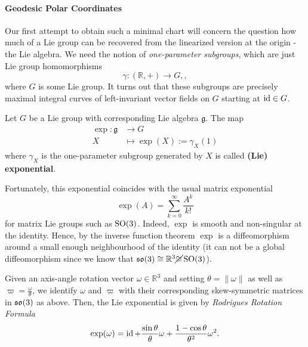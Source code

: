 \paragraph*{Geodesic Polar Coordinates}
Our first attempt to obtain such a minimal chart will concern the question how much of a Lie group can be recovered from the linearized version at the origin - the Lie algebra. We need the notion of \emph{one-parameter subgroups}, which are just Lie group homomorphisms \[
\gamma: (\mathbb{R}, +) \to G,
,\] where $G$ is some Lie group. It turns out that these subgroups are precisely maximal integral curves of left-invariant vector fields on $G$ starting at $\operatorname{id} \in G$.
\begin{definition}
   Let $G$ be a Lie group with corresponding Lie algebra $\mathfrak{g}$. The map 
   \begin{align*}
       \exp: \mathfrak{g} &\to G\\
       X &\mapsto \exp(X):=\gamma_X(1)
   \end{align*}
   where $\gamma_X$ is the one-parameter subgroup generated by $X$ is called \textbf{(Lie) exponential}.
\end{definition}
Fortunately, this exponential coincides with the usual matrix exponential
\[
    \exp(A)=\sum_{k=0}^\infty \frac{A^k}{k!}
\] for matrix Lie groups such as $\operatorname{SO}(3)$. Indeed, $\exp$ is smooth and non-singular at the identity. Hence, by the inverse function theorem $\exp$ is a diffeomorphism around a small enough neighbourhood of the identity (it can not be a global diffeomorphism since we know that $\operatorname{\mathfrak{s}\mathfrak{o}}(3) \cong \mathbb{R}^3 \cancel{\cong} \operatorname{SO}(3)$). 
\begin{theorem}
    Given an axis-angle rotation vector $\omega \in \mathbb{R}^3$ and setting $\theta = \| \omega \|$ as well as $\varpi = \frac{\omega}{\theta}$, we identify $\omega$ and $\varpi$ with their corresponding skew-symmetric matrices in $\operatorname{\mathfrak{s}\mathfrak{o}}(3)$ as above. Then, the Lie exponential is given by \emph{Rodrigues Rotation Formula}
    \begin{equation}
        \exp(\omega) = \operatorname{id} + \frac{\sin \theta}{\theta} \omega + \frac{1-\cos \theta}{\theta^2} \omega^2.
    \end{equation}
\end{theorem}
